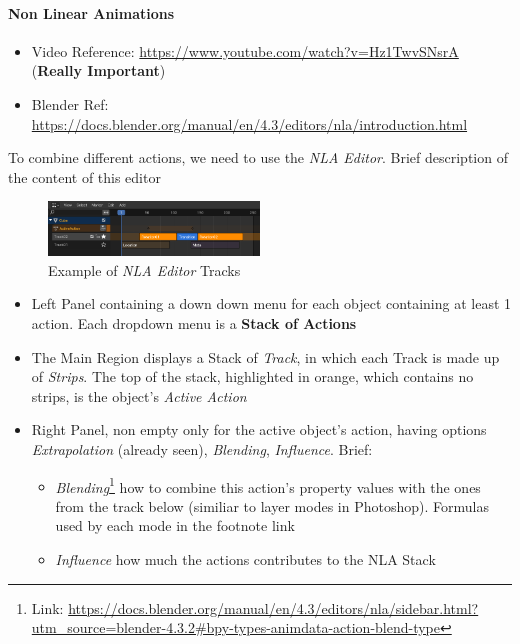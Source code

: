 \documentclass{article}
\begin{document}
\paragraph{Non Linear Animations}
\begin{itemize}[noitemsep, topsep=0pt]
    \item Video Reference: \href{https://www.youtube.com/watch?v=Hz1TwvSNsrA}{https://www.youtube.com/watch?v=Hz1TwvSNsrA} (\textbf{Really Important})\\
    \item Blender Ref: \href{https://docs.blender.org/manual/en/4.3/editors/nla/introduction.html}{https://docs.blender.org/manual/en/4.3/editors/nla/introduction.html}
\end{itemize}
To combine different actions, we need to use the \textit{NLA Editor}. Brief description of the content of this editor
\begin{figure}
    \includegraphics[width=0.5\textwidth]{blender_docs_images/editors_nla_tracks_example.png}
    \caption{Example of \textit{NLA Editor} Tracks}
\end{figure}
\begin{itemize}[noitemsep, topsep=0pt]
    \item Left Panel containing a down down menu for each object containing at least 1 action. Each dropdown menu is a \textbf{Stack of Actions}
    \item The Main Region displays a Stack of \textit{Track}, in which each Track is made up of \textit{Strips}. The top of the stack, highlighted in orange, which contains no strips, is the 
    object's \textit{Active Action}
    \item Right Panel, non empty only for the active object's action, having options \textit{Extrapolation} (already seen), \textit{Blending}, \textit{Influence}. Brief:
    \begin{itemize}[noitemsep, topsep=0pt]
        \item \textit{Blending}\footnote{Link: \href{https://docs.blender.org/manual/en/4.3/editors/nla/sidebar.html?utm_source=blender-4.3.2\#bpy-types-animdata-action-blend-type}{https://docs.blender.org/manual/en/4.3/editors/nla/sidebar.html?utm\_source=blender-4.3.2\#bpy-types-animdata-action-blend-type}}
          how to combine this action's property values with the ones from the track below (similiar to layer modes in Photoshop). Formulas used by each mode in the footnote link 
        \item \textit{Influence} how much the actions contributes to the NLA Stack
    \end{itemize}
\end{itemize}
\end{document}
